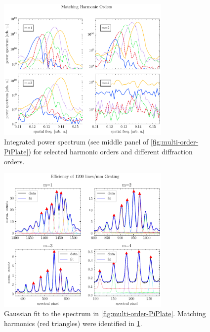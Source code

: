 \begin{figure}
	\centering
	\includegraphics[width=0.75\textwidth]{figures/chap2/twosource-matching-HO.pdf}
	\caption{Integrated power spectrum (see middle panel of \cref{fig:multi-order-PiPlate}) for selected harmonic orders and different diffraction orders.}
	\label{fig:twosource-matching-HO}
\end{figure}

\begin{figure}
	\centering
	\includegraphics[width=0.75\textwidth]{figures/chap2/grating-efficiency.pdf}
	\caption{Gaussian fit to the spectrum in \cref{fig:multi-order-PiPlate}. Matching harmonics (red triangles) were identified in \cref{fig:twosource-matching-HO}.}
	\label{fig:grating-efficiency}
\end{figure}

